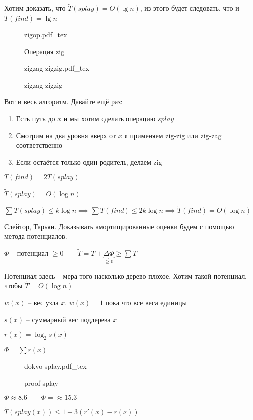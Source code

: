 \documentclass{book}
\theoremstyle{definition}
\newcommand{\tl}[1]{\widetilde{#1}}
\newcommand{\incfig}[1]{%
    \def\svgwidth{\columnwidth}
    {#1.pdf_tex}
}
\begin{document}
Хотим доказать, что $\tl T(splay) = O\left( \lg n \right) $, из этого будет следовать, что и $\tl T(find) = \lg n$

\begin{figure}[!ht]
    \centering
    \incfig{zigop}
    \caption{Операция zig}
    \label{fig:zigop}
\end{figure}

\begin{figure}[!ht]
    \centering
    \incfig{zigzag-zigzig}
    \caption{zigzag-zigzig}
    \label{fig:zigzag-zigzig}
\end{figure}

Вот и весь алгоритм. Давайте ещё раз:
\begin{enumerate}
    \item Есть путь до $x$ и мы хотим сделать операцию  $splay$
    \item Смотрим на два уровня вверх от  $x$ и применяем  zig-zig или zig-zag соответственно
    \item Если остаётся только один родитель, делаем zig
\end{enumerate}

$T(find) = 2 T(splay)$

$\tl T(splay) = O\left( \log n \right)$

$\sum T(splay) \leqslant k \log n \implies \sum T(find) \leqslant 2k\log n \implies \tl T(find) = O(\log n)$

Слейтор, Тарьян. Доказывать амортищированные оценки будем с помощью метода потенциалов.

$\Phi$ -- потенциал  $\geqslant 0\qquad \tl T = T+\underbrace{\Delta\Phi}_{\geqslant 0} \geqslant \sum T$

Потенциал здесь -- мера того насколько дерево плохое. Хотим такой потенциал, чтобы  $\tl T = O\left( \log  n \right) $

$w(x)$ -- вес узла  $x$.  $w(x) = 1$ пока что все веса единицы

$s(x)$ -- суммарный вес поддерева  $x$

$r(x) = \log _2 s(x)$

$\Phi = \sum r(x)$

\begin{figure}[!ht]
    \centering
    \incfig{dokvo-splay}
    \caption{proof-splay}
    \label{fig:proof-splay}
\end{figure}

$\Phi \approx 8.6\qquad \Phi = \approx 15.3$

$\tl T(splay(x)) \leqslant 1+3\left( r'(x) - r(x) \right) $
 
\end{document}
